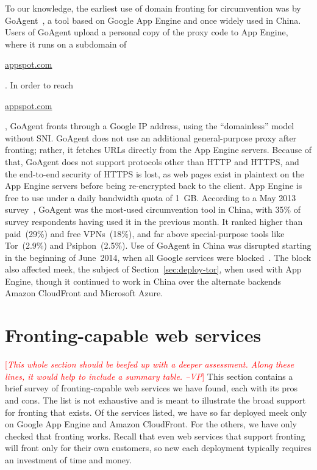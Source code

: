 \documentclass{sig-alternate}
\newcommand{\meek}{meek\xspace}
\def\urll#1{\begin{NoHyper}\url{#1}\end{NoHyper}}
\newcommand{\note}[1]{{\textcolor{red}{[\textit{#1}]}}}
\newcommand{\vp}[1]{\note{#1 --VP}}
\begin{document}
To our knowledge,
the earliest use of domain fronting for circumvention
was by GoAgent~\cite{goagent},
a tool based on Google App Engine and
once widely used in China.
Users of GoAgent upload
a personal copy of the proxy code to App Engine,
where it runs on a subdomain of \urll{appspot.com}.
In order to reach \urll{appspot.com},
GoAgent fronts through a Google IP address,
using the ``domainless'' model without SNI.
GoAgent does not use an additional general-purpose proxy after fronting;
rather, it fetches URLs directly from the App Engine servers.
Because of that, GoAgent does not support protocols other than HTTP and HTTPS,
and the end-to-end security of HTTPS is lost,
as web pages exist in plaintext on the App Engine servers before being re-encrypted back to the client.
App Engine is free to use under a daily bandwidth quota of 1~GB.
According to a May 2013 survey~\cite{collateral-freedom},
GoAgent was the most-used circumvention tool in
China, with 35\% of survey respondents having used it in the previous month.
It ranked higher than paid~(29\%) and free VPNs~(18\%), and far
above special-purpose tools like Tor~(2.9\%) and Psiphon~(2.5\%).
Use of GoAgent in China was disrupted starting in the beginning of June~2014,
when all Google services were blocked~\cite{cn-google-block}.
The block also affected meek, the subject of Section~\ref{sec:deploy-tor},
when used with App Engine, though it continued to work in China over the alternate backends
Amazon CloudFront and Microsoft Azure.





\section{Fronting-capable web services}
\label{sec:survey}

\vp{This whole section should be beefed up with a deeper assessment.  Along
these lines, it would help to include a summary table.}
This section contains a brief survey of fronting-capable
web services we have found, each with its pros and cons.
The list is not exhaustive and is meant to illustrate the broad
support for fronting that exists.
Of the services listed, we have so far deployed \meek
only on Google App Engine and Amazon CloudFront.
For the others, we have only checked that fronting works.
Recall that even web services that support fronting
will front only for their own customers,
so new each deployment typically requires an investment of time and money.
\end{document}
